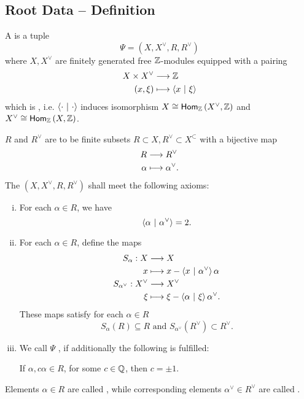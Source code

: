 \subsection{Root Data -- Definition}

\begin{definition}
	A  is a tuple
	\[ \Psi = (X, X^\vee, R, R^\vee) \]
	where $X,X^\vee$ are finitely generated free $\mathbb{Z}$-modules equipped with a pairing
	\begin{align*}
	X \times X^\vee & \overset{}{\longrightarrow} \mathbb{Z}\\
	(x, \xi) &\longmapsto \left<x ~ | ~ \xi\right>
	\end{align*}
	which is , i.e. $\left<\cdot ~ | ~ \cdot\right>$ induces isomorphism $X \overset{}{\cong} \textsf{Hom}_{\mathbb{Z}}\left(X^\vee, \mathbb{Z}\right)$ and $X^\vee \overset{}{\cong} \textsf{Hom}_{\mathbb{Z}}\left(X, \mathbb{Z}\right)$.
	
	$R$ and $R^\vee$ are to be finite subsets $R \subset X, R^\vee \subset X^\subset$ with a bijective map
	\begin{align*}
	R & \overset{}{\longrightarrow} R^\vee\\
	\alpha & \longmapsto \alpha^\vee.
	\end{align*}
	The $(X, X^\vee, R, R^\vee)$ shall meet the following axioms:
	\begin{enumerate}[(i)]
		\item For each $\alpha \in R$, we have
		\[ \left<\alpha ~ | ~ \alpha^\vee\right> = 2. \]
		\item For each $\alpha \in R$, define the maps
		\begin{align*}
		S_\alpha : X & \overset{}{\longrightarrow} X\\
		x & \longmapsto x - \left<x ~ | ~ \alpha^\vee\right> \alpha\\
		S_{\alpha^\vee} : X^\vee & \overset{}{\longrightarrow} X^\vee\\
		\xi & \longmapsto \xi - \left<\alpha ~ | ~ \xi\right> \alpha^\vee.
		\end{align*}
		These maps satisfy for each $\alpha \in R$
		\[ S_\alpha(R) \subseteq R \text{  and  } S_{\alpha^\vee}(R^\vee) \subset R^\vee. \]
		\item We call $\Psi$ , if additionally the following is fulfilled:
		
		If $\alpha, c\alpha \in R$, for some $c \in \mathbb{Q}$, then $c = \pm 1$.
	\end{enumerate}
Elements $\alpha \in R$ are called , while corresponding elements $\alpha^\vee \in R^\vee$ are called .
\end{definition}

